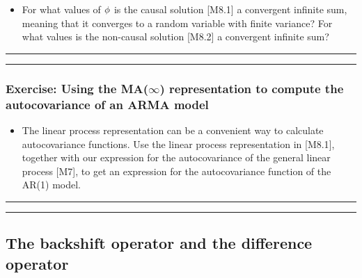 \documentclass[]{article}
\providecommand{\tightlist}{%
  \setlength{\itemsep}{0pt}\setlength{\parskip}{0pt}}
\begin{document}
\begin{itemize}
\tightlist
\item
  For what values of \(\phi\) is the causal solution {[}M8.1{]} a
  convergent infinite sum, meaning that it converges to a random
  variable with finite variance? For what values is the non-causal
  solution {[}M8.2{]} a convergent infinite sum?
\end{itemize}

\begin{center}\rule{0.5\linewidth}{\linethickness}\end{center}

\begin{center}\rule{0.5\linewidth}{\linethickness}\end{center}

\subsubsection{\texorpdfstring{Exercise: Using the MA(\(\infty\))
representation to compute the autocovariance of an ARMA
model}{Exercise: Using the MA(\textbackslash{}infty) representation to compute the autocovariance of an ARMA model}}\label{exercise-using-the-mainfty-representation-to-compute-the-autocovariance-of-an-arma-model}

\begin{itemize}
\tightlist
\item
  The linear process representation can be a convenient way to calculate
  autocovariance functions. Use the linear process representation in
  {[}M8.1{]}, together with our expression for the autocovariance of the
  general linear process {[}M7{]}, to get an expression for the
  autocovariance function of the AR(1) model.
\end{itemize}

\begin{center}\rule{0.5\linewidth}{\linethickness}\end{center}

\begin{center}\rule{0.5\linewidth}{\linethickness}\end{center}

\subsection{The backshift operator and the difference
operator}\label{the-backshift-operator-and-the-difference-operator}
\end{document}
